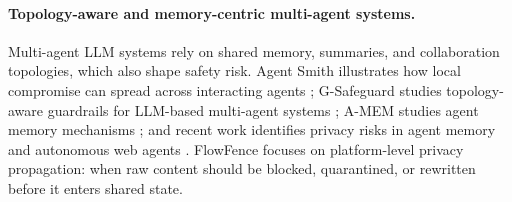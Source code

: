 \paragraph{Topology-aware and memory-centric multi-agent systems.}
Multi-agent LLM systems rely on shared memory, summaries, and collaboration topologies, which also shape safety risk. Agent Smith illustrates how local compromise can spread across interacting agents \cite{gu2024agentsmith}; G-Safeguard studies topology-aware guardrails for LLM-based multi-agent systems \cite{wang2025gsafeguard}; A-MEM studies agent memory mechanisms \cite{xu2025amem}; and recent work identifies privacy risks in agent memory and autonomous web agents \cite{wang2025mextra,zharmagambetov2025agentdam}. FlowFence focuses on platform-level privacy propagation: when raw content should be blocked, quarantined, or rewritten before it enters shared state.
